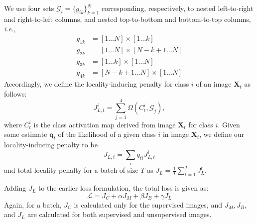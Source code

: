 We use four sets $\mathcal G_i = \{g_{ik}\}_{k=1}^N$ corresponding, respectively, to nested
left-to-right and right-to-left columns, and nested top-to-bottom and bottom-to-top columns,
\textit{i.e.,}
\begin{align}
  g_{1k} & = [1 \ldots N] \times [1 \ldots k] \\
  g_{2k} & = [1 \ldots N] \times [N-k+1 \ldots N] \\
  g_{3k} & = [1 \ldots k] \times [1 \ldots N] \\
  g_{4k} & = [N-k+1 \ldots N] \times [1 \ldots N]
\end{align}
Accordingly, we define the locality-inducing penalty for class $i$ of an image $\mathbf{X}_t$ as follows:
\begin{equation} \label{eq:JLt}
	J_{L,t}^{i} = \sum_{j=1}^{4}\Omega(C^i_t, \mathcal G_j),
\end{equation}
where $C^i_{t}$ is the class activation map \cite{CAM} derived from image $\mathbf X_t$ for class
$i$. Given some estimate $\mathbf q_{t}$ of the likelihood of a given class $i$ in image $\mathbf
X_t$, we define our locality-inducing penalty to be
\begin{equation}
  J_{L,t} = \sum_{i} q_{ti} J_{L,t}^i
\end{equation}
and total locality penalty for a batch of size $T$ as $J_L =  \frac{1}{T} \sum_{t=1}^T J_L^t$. 

Adding $J_L$ to the earlier loss formulation, the total loss is given as:
\begin{equation}
	\label{eq:total}
	\mathcal{L} = J_C + \alpha J_M + \beta J_B + \gamma J_L
\end{equation}
Again, for a batch, $J_C$ is calculated only for the supervised images, and $J_M, J_B, $ and $J_L$
are calculated for both supervised and unsupervised images.
